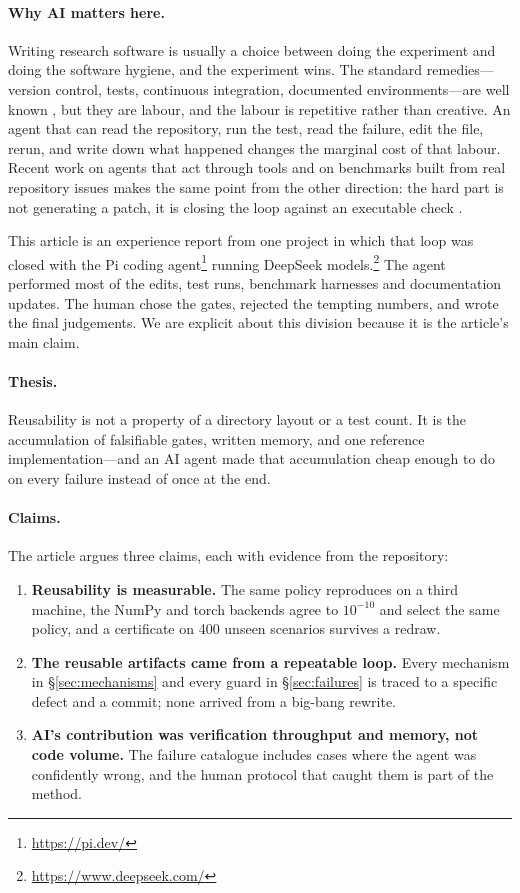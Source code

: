 \paragraph{Why AI matters here.}
Writing research software is usually a choice between doing the experiment and
doing the software hygiene, and the experiment wins. The standard remedies---
version control, tests, continuous integration, documented environments---are
well known \citep{wilson2014best,sandve2013ten}, but they are labour, and the
labour is repetitive rather than creative. An agent that can read the repository,
run the test, read the failure, edit the file, rerun, and write down what
happened changes the marginal cost of that labour. Recent work on agents that
act through tools and on benchmarks built from real repository issues makes the
same point from the other direction: the hard part is not generating a patch,
it is closing the loop against an executable check
\citep{yao2023react,jimenez2024swebench}.

This article is an experience report from one project in which that loop was
closed with the Pi coding agent\footnote{\url{https://pi.dev/}} running DeepSeek
models.\footnote{\url{https://www.deepseek.com/}} The agent performed most of
the edits, test runs, benchmark harnesses and documentation updates. The human
chose the gates, rejected the tempting numbers, and wrote the final judgements.
We are explicit about this division because it is the article's main claim.

\paragraph{Thesis.}
Reusability is not a property of a directory layout or a test count. It is the
accumulation of falsifiable gates, written memory, and one reference
implementation---and an AI agent made that accumulation cheap enough to do on
every failure instead of once at the end.

\paragraph{Claims.}
The article argues three claims, each with evidence from the repository:
\begin{enumerate}
  \item \textbf{Reusability is measurable.} The same policy reproduces on a
        third machine, the NumPy and torch backends agree to $10^{-10}$ and
        select the same policy, and a certificate on 400 unseen scenarios
        survives a redraw.
  \item \textbf{The reusable artifacts came from a repeatable loop.} Every
        mechanism in \S\ref{sec:mechanisms} and every guard in
        \S\ref{sec:failures} is traced to a specific defect and a commit; none
        arrived from a big-bang rewrite.
  \item \textbf{AI's contribution was verification throughput and memory, not
        code volume.} The failure catalogue includes cases where the agent was
        confidently wrong, and the human protocol that caught them is part of
        the method.
\end{enumerate}


